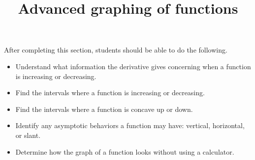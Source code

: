 \documentclass{ximera}
\title{Advanced graphing of functions}
\begin{document}
\begin{abstract}
\end{abstract}

\maketitle

\begin{sectionOutcomes}

After completing this section, students should be able to do the following.

\begin{itemize}
	\item Understand what information the derivative gives concerning when a function is increasing or decreasing.
	\item Find the intervals where a function is increasing or decreasing.
	\item Find the intervals where a function is concave up or down.
	\item Identify any asymptotic behaviors a function may have: vertical, horizontal, or slant.
	\item Determine how the graph of a function looks without using a calculator.
\end{itemize}

\end{sectionOutcomes}
\end{document}
